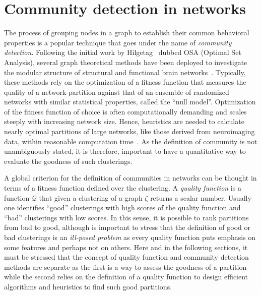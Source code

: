 

\section{Community detection in networks}
\label{sec:communitydetectioninnetworks}
The process of grouping nodes in a graph to establish their common behavioral properties is a popular technique that goes under the name of \emph{community detection}.
Following the initial work by Hilgetag~\cite{hilgetag2000a} dubbed OSA (Optimal Set Analysis), several graph theoretical methods have been deployed to investigate the modular structure of structural and functional brain networks~\cite{meunier2009,meunier2010,power2011,stam2007,stam2014}.
Typically, these methods rely on the optimization of a fitness function that measures the quality of a network partition against that of an ensemble of randomized networks with similar statistical properties, called the ``null model''.
Optimization of the fitness function of choice is often computationally demanding and scales steeply with increasing network size.
Hence, heuristics are needed to calculate nearly optimal partitions of large networks, like those derived from neuroimaging data, within reasonable computation time~\cite{blondel2008,rosvall2008,raghavan2007}.
As the definition of community is not unambiguously stated, it is therefore, important to have a quantitative way to evaluate the goodness of such clusterings.

A global criterion for the definition of communities in networks can be thought in terms of a fitness function defined over the clustering.
A \emph{quality function} is a function $\mathcal{Q}$ that given a clustering of a graph $\zeta$ returns a scalar number. Usually one identifies ``good'' clusterings with high scores of the quality function and ``bad'' clusterings with low scores. In this sense, it is possible to rank partitions from bad to good, although is important to stress that the definition of good or bad clusterings is an \emph{ill-posed problem} as every quality function puts emphasis on some features and perhaps not on others. 
Here and in the following sections, it must be stressed that the concept of quality function and community detection methods are separate as the first is a way to assess the goodness of a partition while the second relies on the definition of a quality function to design efficient algorithms and heuristics to find such good partitions.

